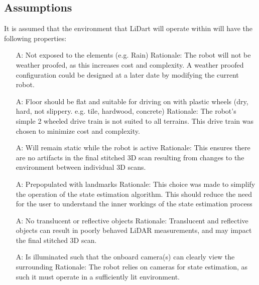 \documentclass[12pt]{article}
\newcounter{assumpnum} %
\begin{document}
\subsection{Assumptions}

It is assumed that the environment that LiDart will operate within will have the following properties:

\noindent \begin{itemize}
\item[A\refstepcounter{assumpnum}\theassumpnum \label{Assumption1}:] Not exposed to the elements (e.g. Rain)
\newline Rationale: The robot will not be weather proofed, as this increases cost and complexity. A weather proofed configuration could be designed at a later date by modifying the current robot.

\item[A\refstepcounter{assumpnum}\theassumpnum \label{Assumption2}:] Floor should be flat and suitable for driving on with plastic wheels (dry, hard, not slippery. e.g. tile, hardwood, concrete)
\newline Rationale: The robot's simple 2 wheeled drive train is not suited to all terrains. This drive train was chosen to minimize cost and complexity.

\item[A\refstepcounter{assumpnum}\theassumpnum \label{Assumption3}:] Will remain static while the robot is active
\newline Rationale: This ensures there are no artifacts in the final stitched 3D scan resulting from changes to the environment between individual 3D scans.

\item[A\refstepcounter{assumpnum}\theassumpnum \label{Assumption4}:] Prepopulated with landmarks
\newline Rationale: This choice was made to simplify the operation of the state estimation algorithm. This should reduce the need for the user to understand the inner workings of the state estimation process

\item[A\refstepcounter{assumpnum}\theassumpnum \label{Assumption5}:] No translucent or reflective objects
\newline Rationale: Translucent and reflective objects can result in poorly behaved LiDAR measurements, and may impact the final stitched 3D scan.

\item[A\refstepcounter{assumpnum}\theassumpnum \label{Assumption6}:] Is illuminated such that the onboard camera(s) can clearly view the surrounding
\newline Rationale: The robot relies on cameras for state estimation, as such it must operate in a sufficiently lit environment. 

\end{itemize}
\end{document}
